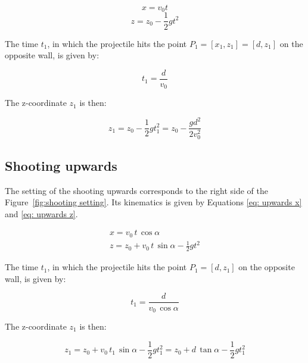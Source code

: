 			\begin{equation} \label{eq: horizontal x}
				x = v_0 t
			\end{equation}
			\begin{equation} \label{eq: horizontal z}
				z = z_0 - \frac{1}{2} g t^2
			\end{equation}
			
			The time $ t_1$, in which the projectile hits the point $P_1 =  [x_1, z_1] = [d, z_1]$ on the opposite wall, is given by:
			
			\begin{equation}
				t_1 = \frac{d}{v_0}
			\end{equation}
			
			The z-coordinate $ z_1$ is then:
			
			\begin{equation} \label{eq: horizontal z1}
				z_1 = z_0 - \frac{1}{2}g t_1^2 = z_0 - \frac{g d^2}{2 v_0^2}
			\end{equation}
		
		\subsection{Shooting upwards}
		
			The setting of the shooting upwards corresponds to the right side of the Figure~\ref{fig:shooting setting}. Its kinematics is given by Equations \eqref{eq: upwards x} and \eqref{eq: upwards z}.
			
			\begin{align}
				x = v_0 \, t \, \cos \alpha \label{eq: upwards x} \\
				z = z_0 + v_0 \, t \, \sin \alpha - \frac{1}{2}g t^2 \label{eq: upwards z}
			\end{align}
			
			The time $ t_1$, in which the projectile hits the point $P_1 =  [d, z_1]$ on the opposite wall, is given by:
			
			\begin{equation}
				t_1 = \frac{d}{v_0 \, \cos \alpha}
			\end{equation}
			
			The z-coordinate $ z_1$ is then:
			
			\begin{equation} \label{eq: upwards z1}
				z_1 = z_0 + v_0 \, t_1 \, \sin \alpha - \frac{1}{2}g t_1^2 = z_0 + d \, \tan \alpha - \frac{1}{2}g t_1^2
			\end{equation}
			

